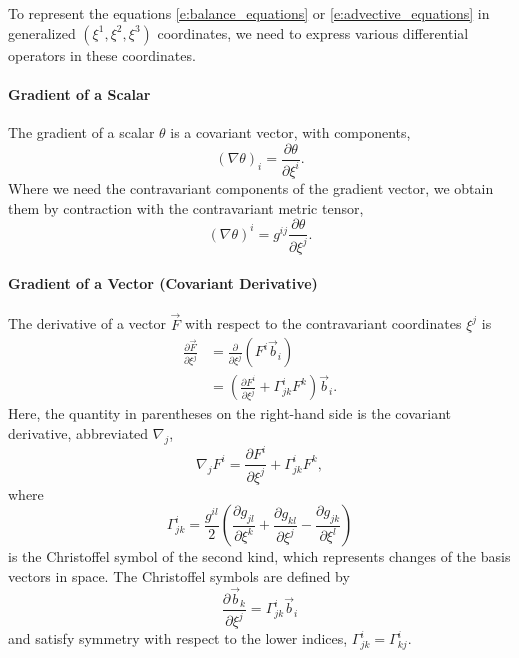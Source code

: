 \documentclass{report}
\begin{document}
To represent the equations \eqref{e:balance_equations} or \eqref{e:advective_equations} in generalized $(\xi^1, \xi^2, \xi^3)$ coordinates, we need to express various differential operators in these coordinates. 

\paragraph{Gradient of a Scalar} The gradient of a scalar $\theta$ is a covariant vector, with components,
\begin{equation}\label{e:scalar_gradient}
(\nabla \theta)_i = \frac{\partial \theta}{\partial \xi^i}.
\end{equation}
Where we need the contravariant components of the gradient vector, we obtain them by contraction with the contravariant metric tensor,
\[
(\nabla \theta)^i = g^{ij} \frac{\partial \theta}{\partial \xi^j}.
\]

\paragraph{Gradient of a Vector (Covariant Derivative)} The derivative of a vector $\vec{F}$ with respect to the contravariant coordinates $\xi^j$ is
\begin{equation}
\begin{split}
\frac{\partial \vec{F}}{\partial \xi^j} & = \frac{\partial}{\partial \xi^j} (F^i \vec{b}_i)\\
& = \left( \frac{\partial F^i}{\partial \xi^j} +  \Gamma^i_{jk} F^k \right) \vec{b}_i.
\end{split}
\end{equation}
Here, the quantity in parentheses on the right-hand side is the covariant derivative, abbreviated $\nabla_j$,
\begin{equation}
    \nabla_j F^i = \frac{\partial F^i}{\partial \xi^j} +  \Gamma^i_{jk} F^k,
\end{equation}
where
\begin{equation}
\Gamma^i_{jk} = \frac{g^{il}}{2} \left( \frac{\partial g_{jl}}{\partial \xi^k} + \frac{\partial g_{kl}}{\partial \xi^j} - \frac{\partial g_{jk}}{\partial \xi^l} \right)
\end{equation}
is the Christoffel symbol of the second kind, which represents changes of the basis vectors in space. The Christoffel symbols are defined by
\[
\frac{\partial\vec{b}_k}{\partial \xi^{j}} = \Gamma^{i}_{jk} \vec{b}_i
\]
and satisfy symmetry with respect to the lower indices, $\Gamma^{i}_{jk} = \Gamma^{i}_{kj}$.
\end{document}
